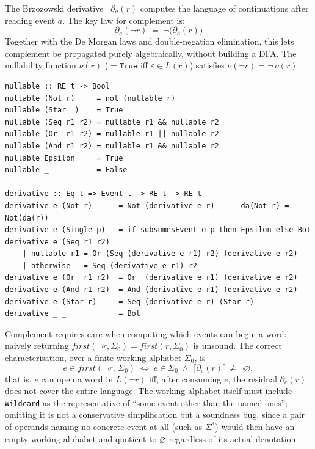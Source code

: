 \documentclass[acmsmall,screen]{acmart}
\newcommand{\norm}[1]{\lceil #1 \rceil}
\newcommand{\univ}{\neg\varnothing}
\begin{document}
The Brzozowski derivative~\cite{brzozowski1964} $\partial_a(r)$ computes
the language of continuations after reading event $a$.
The key law for complement is:
\begin{equation}
  \partial_a(\neg r) \;=\; \neg\bigl(\partial_a(r)\bigr)
  \label{eq:deriv-not}
\end{equation}
Together with the De Morgan laws and double-negation elimination, this lets
complement be propagated purely algebraically, without building a DFA.
The nullability function $\nu(r)$ ($= \mathtt{True}$ iff $\varepsilon \in L(r)$)
satisfies $\nu(\neg r) = \neg\,\nu(r)$:
\begin{lstlisting}
nullable :: RE t -> Bool
nullable (Not r)     = not (nullable r)
nullable (Star _)    = True
nullable (Seq r1 r2) = nullable r1 && nullable r2
nullable (Or  r1 r2) = nullable r1 || nullable r2
nullable (And r1 r2) = nullable r1 && nullable r2
nullable Epsilon     = True
nullable _           = False

derivative :: Eq t => Event t -> RE t -> RE t
derivative e (Not r)      = Not (derivative e r)   -- da(Not r) = Not(da(r))
derivative e (Single p)   = if subsumesEvent e p then Epsilon else Bot
derivative e (Seq r1 r2)
    | nullable r1 = Or (Seq (derivative e r1) r2) (derivative e r2)
    | otherwise   = Seq (derivative e r1) r2
derivative e (Or  r1 r2)  = Or  (derivative e r1) (derivative e r2)
derivative e (And r1 r2)  = And (derivative e r1) (derivative e r2)
derivative e (Star r)     = Seq (derivative e r) (Star r)
derivative _ _            = Bot
\end{lstlisting}
Complement requires care when computing which events can begin a word:
naively returning $\mathit{first}(\neg r, \Sigma_0) = \mathit{first}(r, \Sigma_0)$
is unsound.
The correct characterisation, over a finite working alphabet $\Sigma_0$, is
\begin{equation}
  e \in \mathit{first}(\neg r,\,\Sigma_0)
  \;\iff\;
  e \in \Sigma_0
  \;\wedge\;
  \norm{\partial_e(r)} \neq \univ,
  \label{eq:first-not}
\end{equation}
that is, $e$ can open a word in $L(\neg r)$ iff, after consuming $e$,
the residual $\partial_e(r)$ does not cover the entire language.
The working alphabet itself must include \lstinline{Wildcard} as the
representative of ``some event other than the named ones''; omitting it is
not a conservative simplification but a soundness bug, since a pair of
operands naming no concrete event at all (such as $\Sigma^*$) would then
have an empty working alphabet and quotient to $\varnothing$ regardless of
its actual denotation.
\end{document}
